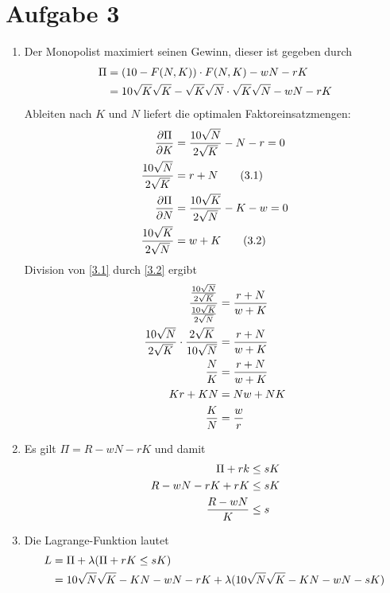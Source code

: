 \documentclass{article}
\begin{document}
	\section*{Aufgabe 3}
	\begin{enumerate}[label=(\alph*)]
		\item Der Monopolist maximiert seinen Gewinn, dieser ist gegeben durch
		\begin{align}
			\Pi &= (10-F(N,K))\cdot F(N,K) - wN - rK \notag \\
			&= 10\sqrt{K}\sqrt{K} - \sqrt{K}\sqrt{N}\cdot\sqrt{K}\sqrt{N} - wN -  rK \notag
		\end{align}
		Ableiten nach $K$ und $N$ liefert die optimalen Faktoreinsatzmengen:
		\begin{align}
			\frac{\partial\Pi}{\partial K} &= \frac{10\sqrt{N}}{2\sqrt{K}} - N - r = 0 \notag \\
			\label{3.1}
			\frac{10\sqrt{N}}{2\sqrt{K}} &= r+N \tag{3.1} \\
			\frac{\partial\Pi}{\partial N} &= \frac{10\sqrt{K}}{2\sqrt{N}} - K - w = 0 \notag \\
			\label{3.2}
			\frac{10\sqrt{K}}{2\sqrt{N}} &= w+K \tag{3.2}
		\end{align}
		Division von \eqref{3.1} durch \eqref{3.2} ergibt
		\begin{align}
			\frac{\frac{10\sqrt{N}}{2\sqrt{K}}}{\frac{10\sqrt{K}}{2\sqrt{N}}} &= \frac{r+N}{w+K} \notag \\
			\frac{10\sqrt{N}}{2\sqrt{K}} \cdot \frac{2\sqrt{K}}{10\sqrt{N}} &= \frac{r+N}{w+K} \notag \\
			\frac{N}{K} &= \frac{r+N}{w+K} \notag \\
			Kr + KN &= Nw + NK \notag \\
			\frac{K}{N} &= \frac{w}{r} \notag
		\end{align}
		\item Es gilt $\Pi = R - wN - rK$ und damit
		\begin{align}
			\Pi + rk &\le sK \notag \\
			R - wN - rK + rK &\le sK \notag \\
			\frac{R-wN}{K} &\le s \notag
		\end{align}
		\item Die Lagrange-Funktion lautet
		\begin{align}
			L &= \Pi + \lambda(\Pi + rK \le sK) \notag \\
			&= 10\sqrt{N}\sqrt{K} - KN - wN - rK + \lambda(10\sqrt{N}\sqrt{K} - KN - wN - sK) \notag
		\end{align}

\end{enumerate}
\end{document}
